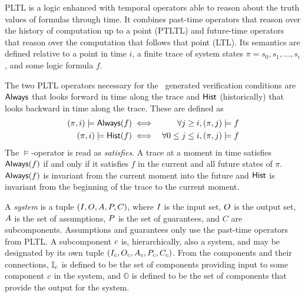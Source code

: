 PLTL is a logic enhanced with temporal operators able to reason about
the truth values of formulas through time.  It combines past-time
operators that reason over the history of computation up to a point
(PTLTL) and future-time operators that reason over the computation
that follows that point (LTL).  Its semantics are defined relative to
a point in time $i$, a finite trace of system states $\pi = s_0, s_1,
\ldots, s_i$, and some logic formula $f$.

The two PLTL operators necessary for the \agr\ generated verification
conditions are $\mathsf{Always}$ that looks forward in time along
the trace and $\mathsf{Hist}$ (historically) that looks backward in
time along the trace.  These are defined as
\begin{eqnarray*}
 (\pi, i) \models \mathsf{Always}(f) & \iff & \forall j \ge i, (\pi, j) \models f \\
(\pi, i) \models \mathsf{Hist}(f) & \iff & \forall 0 \le j \le i, (\pi, j) \models f
\end{eqnarray*}
The $\models$-operator is read as \emph{satisfies}.  A trace at a
moment in time satisfies $\mathsf{Always}(f)$ if and only if it satisfies
$f$ in the current and all future states of $\pi$.  $\mathsf{Always}(f)$ is
invariant from the current moment into the future and $\mathsf{Hist}$ is
invariant from the beginning of the trace to the current moment.

A \emph{system} is a tuple $(I, O, A,
P,C)$, where $I$ is the input set, $O$ is the
output set, $A$ is the set of assumptions, $P$ is the
set of guarantees, and $C$ are subcomponents.  Assumptions and guarantees only use the past-time operators from PLTL. A subcomponent
$c$ is, hierarchically, also a system, and may be designated
by its own tuple $(I_{c}, O_{c},
A_{c}, P_{c}, C_c)$.  From the
components and their connections, $\mathbb{I}_{c}$ is defined
to be the set of components providing input to some component
$c$ in the system, and $\mathbb{O}$ is defined to be the set
of components that provide the output for the system.

